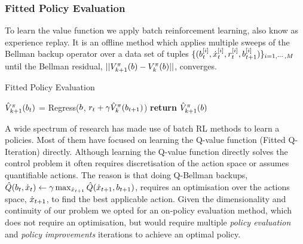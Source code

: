 \subsubsection{Fitted Policy Evaluation}

To learn the value function we apply batch reinforcement learning\cite{EGW05}, also know as experience replay.
It is an offline method which applies multiple sweeps of the Bellman backup operator 
over a data set of tuples $\{(b^{[i]}_t,\dot{x}^{[i]}_t,r^{[i]}_{t},b^{[i]}_{t+1})\}_{i=1,\cdots,M}$ until the Bellman residual,
$||V^{\pi}_{k+1}(b) - V^{\pi}_{k}(b)||$, converges. 

\begin{algorithm} 
\caption{Fitted Policy Evaluation}
\label{alg:fpe}
\begin{algorithmic}[1]
        \State $\hat{V}^{\pi}_{k+1}(b_t)$ = Regress($b$, $r_t + \gamma \hat{V}^{\pi}_k(b_{t+1})$)
	  \State \textbf{return} $\hat{V}^{\pi}_{k+1}(b)$
	 \EndIf
    \EndFor
\end{algorithmic}
\end{algorithm}

A wide spectrum of research has made use of batch RL methods to learn a policies. 
Most of them have focused on learning the Q-value function (Fitted Q-Iteration) 
\cite{NIPS2008_3501,EGW05,Riedmiller05neuralfitted} directly. Although learning the 
Q-value function directly solves the control problem it often requires discretisation 
of the action space or assumes quantifiable actions. The reason is that doing 
Q-Bellman backups, $\hat{Q}(b_t,\dot{x}_t) \leftarrow \gamma \max_{\dot{x}_{t+1}} \hat{Q}(\dot{x}_{t+1},b_{t+1})$, 
requires an optimisation over the actions space, $\dot{x}_{t+1}$, to find the best applicable action. 
Given the dimensionality and continuity of our problem we opted for an on-policy evaluation method, 
which does not require an optimisation, but would require multiple 
\textit{policy evaluation} and \textit{policy improvements} iterations to achieve an optimal policy. 


